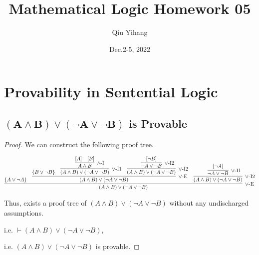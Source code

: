 \documentclass{article}
\title{\textbf{Mathematical Logic Homework 05}}
\author{Qiu Yihang}
\date{Dec.2-5, 2022}
\begin{document}
\maketitle

\vspace{2em}
\section{Provability in Sentential Logic}
\vspace{1em}
\subsection{$\boldsymbol{\left(A\land B\right)
\lor\left(\neg A\lor\neg B\right)}$ is Provable}
\vspace{1em}
\begin{proof}
    We can construct the following proof tree.

    \small
    \vspace{-1em}
    \begin{align*}
        \infer[\lor\text{-E}]{\left(A\land B\right)
        \lor\left(\neg A\lor\neg B\right)}
        {
            \left\{A\lor\neg A\right\}
            & 
            \infer[\lor\text{-E}]{\left(A\land B\right)
            \lor\left(\neg A\lor\neg B\right)}
            {
                \left\{B\lor\neg B\right\}
                &
                \infer[\lor\text{-I1}]{\left(A\land B\right)
                \lor\left(\neg A\lor\neg B\right)}
                {
                    \infer[\land\text{-I}]{A\land B}
                    {
                        \left[A\right] & \left[B\right]
                    }
                }
                &
                \infer[\lor\text{-I2}]{\left(A\land B\right)
                \lor\left(\neg A\lor\neg B\right)}
                {
                    \infer[\lor\text{-I2}]{\neg A\lor\neg B}
                    {\left[\neg B\right]}
                }
            }
            &
            \infer[\lor\text{-I2}]{\left(A\land B\right)
            \lor\left(\neg A\lor\neg B\right)}
            {
                \infer[\lor\text{-I1}]{\neg A\lor\neg B}
                {\left[\neg A\right]}
            }
        }
    \end{align*}    

    \normalsize
    \hspace{1.3em}
    Thus, exists a proof tree of 
    $\left(A\land B\right)
    \lor\left(\neg A\lor\neg B\right)$ without any undischarged assumptions.

    \hspace{1.3em}
    i.e. $\vdash \left(A\land B\right)
    \lor\left(\neg A\lor\neg B\right)$,

    \hspace{1.3em}
    i.e. $\left(A\land B\right)
    \lor\left(\neg A\lor\neg B\right)$ is provable.
\end{proof}
\end{document}
